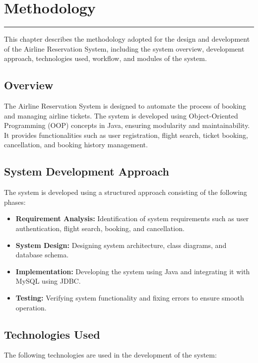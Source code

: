 \chapter{Methodology}
\noindent\rule{\linewidth}{2pt}
This chapter describes the methodology adopted for the design and development of the Airline Reservation System, including the system overview, development approach, technologies used, workflow, and modules of the system.

\section{Overview}

The Airline Reservation System is designed to automate the process of booking and managing airline tickets. The system is developed using Object-Oriented Programming (OOP) concepts in Java, ensuring modularity and maintainability. It provides functionalities such as user registration, flight search, ticket booking, cancellation, and booking history management.

\section{System Development Approach}

The system is developed using a structured approach consisting of the following phases:

\begin{itemize}
\item \textbf{Requirement Analysis:} Identification of system requirements such as user authentication, flight search, booking, and cancellation.

\item \textbf{System Design:} Designing system architecture, class diagrams, and database schema.

\item \textbf{Implementation:} Developing the system using Java and integrating it with MySQL using JDBC.

\item \textbf{Testing:} Verifying system functionality and fixing errors to ensure smooth operation.
\end{itemize}

\section{Technologies Used}

The following technologies are used in the development of the system:

